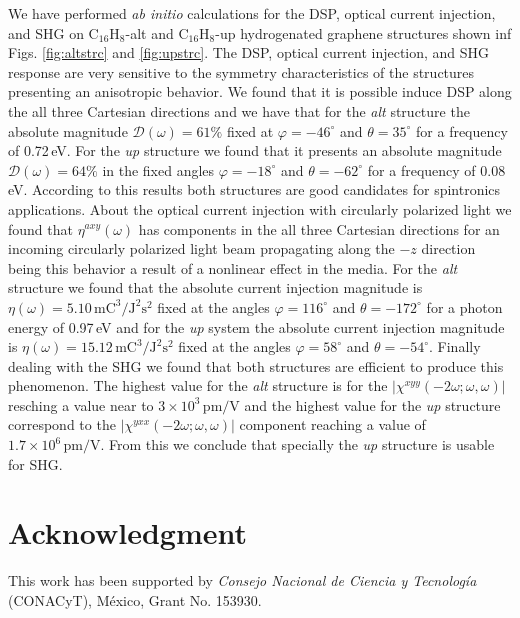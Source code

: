 \documentclass[pss]{wiley2sp} %
\begin{document}
We have performed \emph{ab initio} calculations for the DSP, optical current injection, and SHG on C$_{16}$H$_{8}$-alt and C$_{16}$H$_{8}$-up hydrogenated graphene structures shown inf Figs. \ref{fig:altstrc} and \ref{fig:upstrc}. The DSP, optical current injection, and SHG response are very sensitive to the symmetry characteristics of the structures presenting an anisotropic behavior. 
We found that it is possible induce DSP along the all three Cartesian directions and we have that for the \emph{alt} structure the absolute magnitude $\mathcal{D}(\omega)=61\%$ fixed at $\varphi=-46^{\circ}$ and $\theta=35^{\circ}$ for a frequency of 0.72\,eV. For the \emph{up} structure we found that it presents an absolute magnitude $\mathcal{D}(\omega)=64\%$ in the fixed angles $\varphi=-18^{\circ}$ and $\theta=-62^{\circ}$ for a frequency of 0.08\,eV. According to this results both structures are good candidates for spintronics applications.
About the optical current injection with circularly polarized light we found that $\eta^{axy}(\omega)$ has components in the all three Cartesian directions for an incoming circularly polarized light beam propagating along the $-z$ direction being this behavior a result of a nonlinear effect in the media. 
For the \emph{alt} structure we found that the absolute current injection magnitude is $\eta(\omega)=5.10\,\mathrm{mC}^{3}/\mathrm{J}^{2}\mathrm{s}^{2}$ fixed at the angles $\varphi=116^{\circ}$ and $\theta=-172^{\circ}$ for a photon energy of 0.97\,eV and for the \emph{up} system the absolute current injection magnitude is $\eta(\omega)=15.12\,\mathrm{mC}^{3}/\mathrm{J}^{2}\mathrm{s}^{2}$ fixed at the angles $\varphi=58^{\circ}$ and $\theta=-54^{\circ}$.
Finally dealing with the SHG we found that both structures are efficient to produce this phenomenon. The highest value for the \emph{alt} structure is for the $|\chi^{xyy}(-2\omega;\omega,\omega)|$ resching a value near to $3\times10^{3}\,\mathrm{pm/V}$ and the highest value for the \emph{up} structure correspond to the $|\chi^{yxx}(-2\omega;\omega,\omega)|$ component reaching a value of $1.7\times10^{6}\,\mathrm{pm/V}$. From this we conclude that specially the \emph{up} structure is usable for SHG.



\section{Acknowledgment} %

This work has been supported by \emph{Consejo Nacional de Ciencia y
Tecnolog\'ia} (CONACyT), M\'exico, Grant No. 153930.




\end{document}

